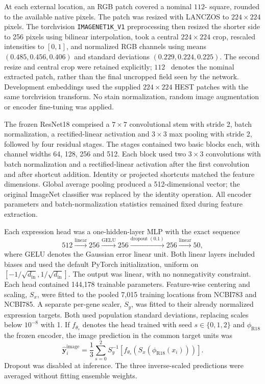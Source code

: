 At each external location, an RGB patch covered a nominal $112$-\um{} square, rounded to the available native pixels. The patch was resized with LANCZOS to $224\times224$ pixels. The torchvision \texttt{IMAGENET1K\_V1} preprocessing then resized the shorter side to 256 pixels using bilinear interpolation, took a central $224\times224$ crop, rescaled intensities to $[0,1]$, and normalized RGB channels using means $(0.485,0.456,0.406)$ and standard deviations $(0.229,0.224,0.225)$. The second resize and central crop were retained explicitly; $112$~\um{} denotes the nominal extracted patch, rather than the final uncropped field seen by the network. Development embeddings used the supplied $224\times224$ HEST patches with the same torchvision transform. No stain normalization, random image augmentation or encoder fine-tuning was applied.

The frozen ResNet18\cite{he2016} comprised a $7\times7$ convolutional stem with stride 2, batch normalization, a rectified-linear activation and $3\times3$ max pooling with stride 2, followed by four residual stages. The stages contained two basic blocks each, with channel widths 64, 128, 256 and 512. Each block used two $3\times3$ convolutions with batch normalization and a rectified-linear activation after the first convolution and after shortcut addition. Identity or projected shortcuts matched the feature dimensions. Global average pooling produced a 512-dimensional vector; the original ImageNet classifier was replaced by the identity operation. All encoder parameters and batch-normalization statistics remained fixed during feature extraction.

Each expression head was a one-hidden-layer MLP with the exact sequence
\begin{equation}
512 \xrightarrow{\mathrm{linear}}256
\xrightarrow{\mathrm{GELU}}256
\xrightarrow{\mathrm{dropout}\;(0.1)}256
\xrightarrow{\mathrm{linear}}50,
\label{eq:head}
\end{equation}
where GELU denotes the Gaussian error linear unit. Both linear layers included biases and used the default PyTorch initialization, uniform on $[-1/\sqrt{d_{\mathrm{in}}},1/\sqrt{d_{\mathrm{in}}}]$. The output was linear, with no nonnegativity constraint. Each head contained 144,178 trainable parameters. Feature-wise centering and scaling, $S_x$, were fitted to the pooled 7,015 training locations from NCBI783 and NCBI785. A separate per-gene scaler, $S_y$, was fitted to their already normalized expression targets. Both used population standard deviations, replacing scales below $10^{-8}$ with 1. If $f_{\theta_s}$ denotes the head trained with seed $s\in\{0,1,2\}$ and $\phi_{\mathrm{R18}}$ the frozen encoder, the image prediction in the common target units was
\begin{equation}
\widehat{\boldsymbol y}^{\mathrm{image}}_i
=\frac{1}{3}\sum_{s=0}^{2}
S_y^{-1}\!\left[f_{\theta_s}\!\left(S_x\!\left(\phi_{\mathrm{R18}}(x_i)\right)\right)\right].
\label{eq:image_ensemble}
\end{equation}
Dropout was disabled at inference. The three inverse-scaled predictions were averaged without fitting ensemble weights.


